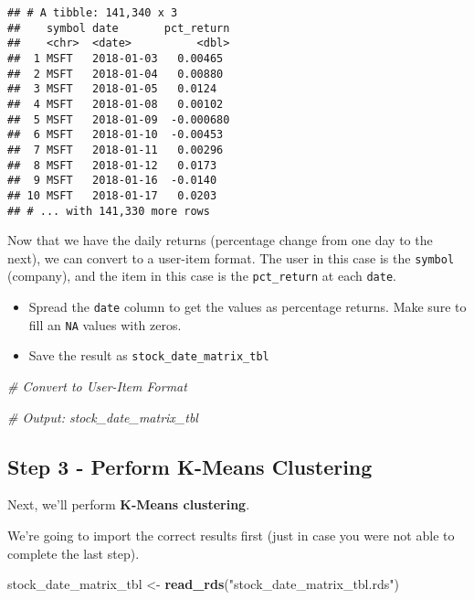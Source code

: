 \documentclass[
]{article}
\newenvironment{Shaded}{\begin{snugshade}}{\end{snugshade}}
\newcommand{\CommentTok}[1]{\textcolor[rgb]{0.56,0.35,0.01}{\textit{#1}}}
\newcommand{\KeywordTok}[1]{\textcolor[rgb]{0.13,0.29,0.53}{\textbf{#1}}}
\newcommand{\NormalTok}[1]{#1}
\newcommand{\StringTok}[1]{\textcolor[rgb]{0.31,0.60,0.02}{#1}}
\providecommand{\tightlist}{%
  \setlength{\itemsep}{0pt}\setlength{\parskip}{0pt}}
\begin{document}
\begin{verbatim}
## # A tibble: 141,340 x 3
##    symbol date       pct_return
##    <chr>  <date>          <dbl>
##  1 MSFT   2018-01-03   0.00465 
##  2 MSFT   2018-01-04   0.00880 
##  3 MSFT   2018-01-05   0.0124  
##  4 MSFT   2018-01-08   0.00102 
##  5 MSFT   2018-01-09  -0.000680
##  6 MSFT   2018-01-10  -0.00453 
##  7 MSFT   2018-01-11   0.00296 
##  8 MSFT   2018-01-12   0.0173  
##  9 MSFT   2018-01-16  -0.0140  
## 10 MSFT   2018-01-17   0.0203  
## # ... with 141,330 more rows
\end{verbatim}

Now that we have the daily returns (percentage change from one day to
the next), we can convert to a user-item format. The user in this case
is the \texttt{symbol} (company), and the item in this case is the
\texttt{pct\_return} at each \texttt{date}.

\begin{itemize}
\tightlist
\item
  Spread the \texttt{date} column to get the values as percentage
  returns. Make sure to fill an \texttt{NA} values with zeros.
\item
  Save the result as \texttt{stock\_date\_matrix\_tbl}
\end{itemize}

\begin{Shaded}
\begin{Highlighting}[]
\CommentTok{# Convert to User-Item Format}

\CommentTok{# Output: stock_date_matrix_tbl}
\end{Highlighting}
\end{Shaded}

\hypertarget{step-3---perform-k-means-clustering}{%
\subsection{Step 3 - Perform K-Means
Clustering}\label{step-3---perform-k-means-clustering}}

Next, we'll perform \textbf{K-Means clustering}.

We're going to import the correct results first (just in case you were
not able to complete the last step).

\begin{Shaded}
\begin{Highlighting}[]
\NormalTok{stock_date_matrix_tbl <-}\StringTok{ }\KeywordTok{read_rds}\NormalTok{(}\StringTok{"stock_date_matrix_tbl.rds"}\NormalTok{)}
\end{Highlighting}
\end{Shaded}
\end{document}
